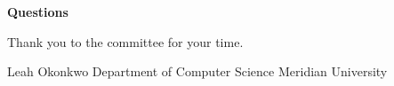\begin{frame}[plain]
  \begin{center}
    \vspace{1.2cm}
    {\color{navy}\Huge\bfseries Questions}\par
    \vspace{0.6cm}
    {\large\color{slate} Thank you to the committee for your time.}\par
    \vspace{1.0cm}
    {\small\color{slate}
      Leah Okonkwo \textbullet{} Department of Computer Science \textbullet{} Meridian University}
  \end{center}
\end{frame}
